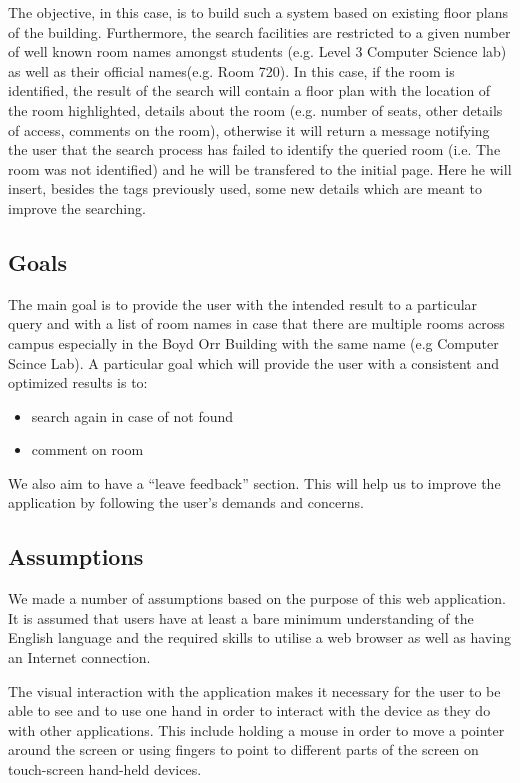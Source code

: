 \documentclass{sig-alt-release2}
\begin{document}
The objective, in this case, is to build such a system based on existing 
floor plans of the building. Furthermore, the search facilities are
restricted to a given number of well known room names amongst students
(e.g. Level 3 Computer Science lab) as well as their official names(e.g. Room
720). In this case, if the room is identified, the result of the search will
contain a floor plan with the location of the room highlighted, details
about the room (e.g. number of seats, other details of access, comments on the
room), otherwise it will return a message notifying the user that the search 
process has failed to identify the queried room (i.e. The room was not identified) 
and he will be transfered to the initial page. Here he will insert, besides the tags 
previously used, some new details which are meant to improve the searching.

\subsection{Goals}
The main goal is to provide the user with the intended result to a particular query and 
with a list of room names in case that there are multiple rooms across campus 
especially in the Boyd Orr Building with the same name (e.g Computer Scince Lab).
A particular goal which will provide the user with a consistent and optimized
results is to:
\begin{itemize} \itemsep1pt \parskip0pt 
	\item  search again in case of not found 
	\item  comment on room 
\end{itemize}

We also aim to have a ``leave feedback'' section. This will help us to improve the application
by following the user's demands and concerns.


\subsection{Assumptions}

We made a number of assumptions based on the purpose of this web application. 
It is assumed that users have at least a bare minimum understanding of the English
language and the required skills to utilise a web browser  as well as having 
an Internet connection.

The visual interaction with the application makes it necessary for the user to 
be able to see and to use one hand in order to interact with the device as they 
do with other applications. This include holding a mouse in order to move a 
pointer around the screen or using fingers to point to different parts of the 
screen on touch-screen hand-held devices.
\end{document}
